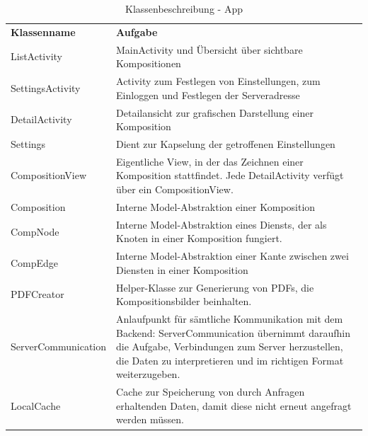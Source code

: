 \begin{table}[h]
	\centering
	\begin{tabularx}{\textwidth}{p{} X}
		\rowcolor[HTML]{C0C0C0} 
		\textbf{Klassenname} & \textbf{Aufgabe} \\
		ListActivity & MainActivity und Übersicht über sichtbare Kompositionen  \\
		\rowcolor[HTML]{E7E7E7} 
		SettingsActivity & Activity zum Festlegen von Einstellungen, zum Einloggen und Festlegen der Serveradresse \\
		DetailActivity & Detailansicht zur grafischen Darstellung einer Komposition \\
		\rowcolor[HTML]{E7E7E7} 
		Settings & Dient zur Kapselung der getroffenen Einstellungen \\
		CompositionView & Eigentliche View, in der das Zeichnen einer Komposition stattfindet. Jede DetailActivity verfügt über ein CompositionView. \\
		\rowcolor[HTML]{E7E7E7} 
		Composition & Interne Model-Abstraktion einer Komposition \\
		CompNode & Interne Model-Abstraktion eines Diensts, der als Knoten in einer Komposition fungiert. \\
		\rowcolor[HTML]{E7E7E7} 
		CompEdge & Interne Model-Abstraktion einer Kante zwischen zwei Diensten in einer Komposition \\
		PDFCreator & Helper-Klasse zur Generierung von PDFs, die Kompositionsbilder beinhalten. \\
			\rowcolor[HTML]{E7E7E7} 
		ServerCommunication & Anlaufpunkt für sämtliche Kommunikation mit dem Backend: ServerCommunication übernimmt daraufhin die Aufgabe, Verbindungen zum Server herzustellen, die Daten zu interpretieren und im richtigen Format weiterzugeben. \\
		LocalCache & Cache zur Speicherung von durch Anfragen erhaltenden Daten, damit diese nicht erneut angefragt werden müssen. 
	\end{tabularx}
	\caption{Klassenbeschreibung - App}
	\label{table:klassenbeschreibung-a}
\end{table}